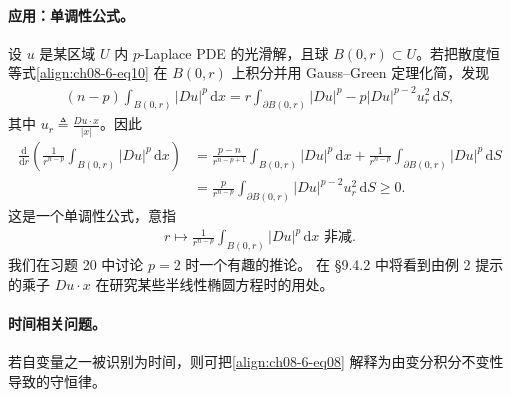 \documentclass[../../main.tex]{subfiles}
\begin{document}
\paragraph{应用：单调性公式。}设 $u$ 是某区域 $U$ 内 $p$-Laplace PDE 的光滑解，且球 $B(0,r)\subset U$。若把散度恒等式\eqref{align:ch08-6-eq10} 在 $B(0,r)$ 上积分并用 Gauss--Green 定理化简，发现
\begin{align*}
(n-p)\int_{B(0,r)}|Du|^p\,\mathrm{d}x=r\int_{\partial B(0,r)}|Du|^p-p|Du|^{p-2}u_r^2\,\mathrm{d}S,
\end{align*}
其中 $u_r\triangleq\frac{Du\cdot x}{|x|}$。因此
\begin{align*}
\frac{\mathrm{d}}{\mathrm{d}r}\left(\frac1{r^{n-p}}\int_{B(0,r)}|Du|^p\,\mathrm{d}x\right)&=\frac{p-n}{r^{n-p+1}}\int_{B(0,r)}|Du|^p\,\mathrm{d}x+\frac1{r^{n-p}}\int_{\partial B(0,r)}|Du|^p\,\mathrm{d}S\\
&=\frac{p}{r^{n-p}}\int_{\partial B(0,r)}|Du|^{p-2}u_r^2\,\mathrm{d}S\geqslant 0.
\end{align*}
这是一个单调性公式，意指
\begin{align*}
r\mapsto\frac1{r^{n-p}}\int_{B(0,r)}|Du|^p\,\mathrm{d}x\text{ 非减}.
\end{align*}
我们在习题 20 中讨论 $p=2$ 时一个有趣的推论。
在 \S9.4.2 中将看到由例 2 提示的乘子 $Du\cdot x$ 在研究某些半线性椭圆方程时的用处。

\paragraph{时间相关问题。}若自变量之一被识别为时间，则可把\eqref{align:ch08-6-eq08} 解释为由变分积分不变性导致的守恒律。
\end{document}

